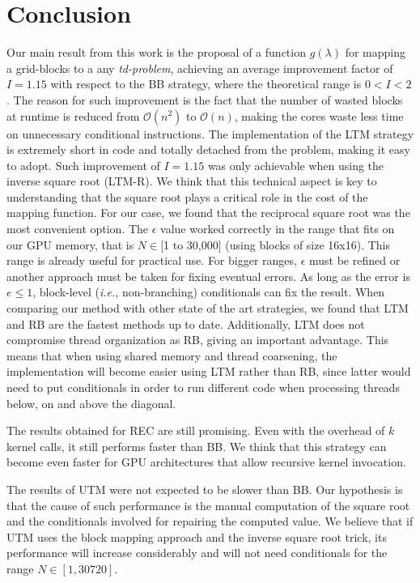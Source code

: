 \documentclass[conference]{IEEEtran}
\begin{document}
\section{Conclusion}
\label{sec_conclusions}
Our main result from this work is the proposal of a function $g(\lambda)$ for mapping a grid-blocks to a any \textit{td-problem}, 
achieving an average improvement factor of $I=1.15$ with respect to the BB strategy, where the theoretical range is $0 < I < 2$. 
The reason for such improvement is the fact that the number of wasted blocks at runtime is reduced from 
$\mathcal{O}(n^2)$ to $\mathcal{O}(n)$, making the cores waste less time on unnecessary conditional instructions. 
The implementation of the LTM strategy is extremely short in code and totally detached from the problem, making it easy to adopt.
Such improvement of $I = 1.15$ was only achievable when using the inverse square root (LTM-R). We think that this technical aspect is key 
to understanding that the square root plays a critical role in the cost of the mapping function. For our case, we found that the reciprocal square root was the most convenient option. 
The $\epsilon$ value worked correctly in the range that fits on our GPU memory, that is $N \in [$1 to 30,000$]$ (using blocks of size 16x16). 
This range is already useful for practical use. For bigger ranges, $\epsilon$ must be refined or another approach must be taken 
for fixing eventual errors. As long as the error is $e \le 1$, block-level (\textit{i.e.}, non-branching) conditionals can fix the result.
When comparing our method with other state of the art strategies, we found that LTM and RB are the fastest methods up to date. Additionally, LTM does not compromise thread organization as RB, giving an 
important advantage. This means that when using shared memory and thread coarsening, the implementation will become easier using LTM rather than RB, since latter would need to 
put conditionals in order to run different code when processing threads below, on and above the diagonal.

The results obtained for REC are still promising. Even with the overhead of $k$ kernel calls, it still performs faster than BB. We think that this strategy can become even faster for GPU architectures that 
allow recursive kernel invocation. 

The results of UTM were not expected to be slower than BB. Our hypothesis is that the cause of such performance is the manual computation of the square root and the 
conditionals involved for repairing the computed value. We believe that if UTM uses the block mapping approach and the inverse square root trick, its performance will increase considerably 
and will not need conditionals for the range $N \in [1,30720]$.
\end{document}
